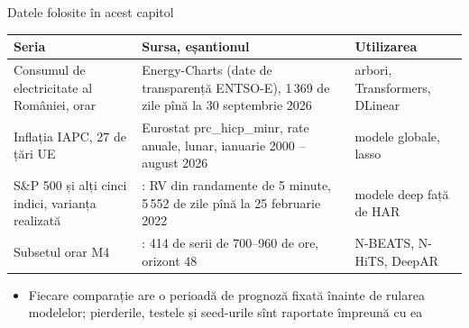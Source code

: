 \begin{frame}{Datele folosite în acest capitol}
\itemsize{\footnotesize}
\begin{center}
\scriptsize
\begin{tabular}{>{\raggedright\arraybackslash}p{3.0cm}>{\raggedright\arraybackslash}p{5.6cm}>{\raggedright\arraybackslash}p{3.6cm}}
\toprule
\textbf{Seria} & \textbf{Sursa, eșantionul} & \textbf{Utilizarea} \\
\midrule
Consumul de electricitate al României, orar & Energy-Charts (date de transparență ENTSO-E), 1\,369 de zile pînă la 30 septembrie 2026 & arbori, Transformers, DLinear \\
Inflația IAPC, 27 de țări UE & Eurostat prc\_hicp\_minr, rate anuale, lunar, ianuarie 2000 -- august 2026 & modele globale, lasso \\
S\&P 500 și alți cinci indici, varianța realizată & : RV din randamente de 5 minute, 5\,552 de zile pînă la 25 februarie 2022 & modele deep față de HAR \\
Subsetul orar M4 & : 414 de serii de 700--960 de ore, orizont 48 & N-BEATS, N-HiTS, DeepAR \\
\bottomrule
\end{tabular}
\end{center}
\begin{itemize}
    \item Fiecare comparație are o perioadă de prognoză fixată înainte de rularea modelelor; pierderile, testele și seed-urile sînt raportate împreună cu ea
\end{itemize}
\end{frame}

